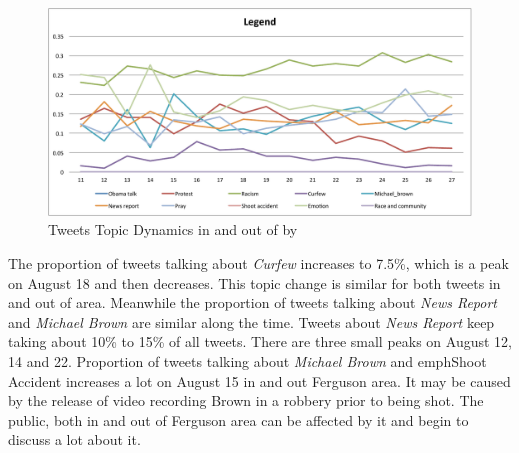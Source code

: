 \begin{figure}[htpb]
\centering
{}
\includegraphics[width=\linewidth]{figures/Legend.pdf}
\caption{Tweets Topic Dynamics in and out of \stlouis by \stlda}\label{fig:tweets_topics_stlouis}
\end{figure}

The proportion of tweets talking about \emph{Curfew} increases to 7.5\%, which is a peak on August 18 and then decreases. This topic change is similar for both tweets in and out of \stlouis area. Meanwhile the proportion of tweets talking about \emph{News Report} and \emph{Michael Brown} are similar along the time. Tweets about \emph{News Report} keep taking about 10\% to 15\% of all tweets. There are three small peaks on August 12, 14 and 22. Proportion of tweets talking about \emph{Michael Brown} and emph{Shoot Accident} increases a lot on August 15 in and out Ferguson area. It may be caused by the release of video recording Brown in a robbery prior to being shot. The public, both in and out of Ferguson area can be affected by it and begin to discuss a lot about it.

